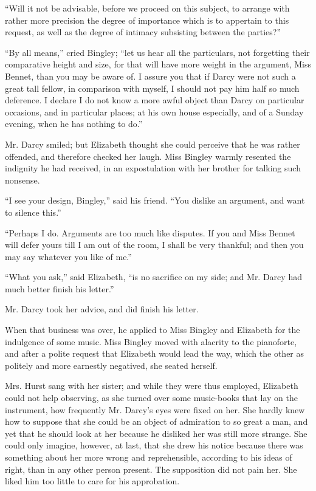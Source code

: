\documentclass[12pt,openright]{book}
\begin{document}
“Will it not be advisable, before we proceed on this subject, to arrange with rather more precision the degree of importance which is to appertain to this request, as well as the degree of intimacy subsisting between the parties?”

“By all means,” cried Bingley; “let us hear all the particulars, not forgetting their comparative height and size, for that will have more weight in the argument, Miss Bennet, than you may be aware of. I assure you that if Darcy were not such a great tall fellow, in comparison with myself, I should not pay him half so much deference. I declare I do not know a more awful object than Darcy on particular occasions, and in particular places; at his own house especially, and of a Sunday evening, when he has nothing to do.”

Mr. Darcy smiled; but Elizabeth thought she could perceive that he was rather offended, and therefore checked her laugh. Miss Bingley warmly resented the indignity he had received, in an expostulation with her brother for talking such nonsense.

“I see your design, Bingley,” said his friend. “You dislike an argument, and want to silence this.”

“Perhaps I do. Arguments are too much like disputes. If you and Miss Bennet will defer yours till I am out of the room, I shall be very thankful; and then you may say whatever you like of me.”

“What you ask,” said Elizabeth, “is no sacrifice on my side; and Mr. Darcy had much better finish his letter.”

Mr. Darcy took her advice, and did finish his letter.

When that business was over, he applied to Miss Bingley and Elizabeth for the indulgence of some music. Miss Bingley moved with alacrity to the pianoforte, and after a polite request that Elizabeth would lead the way, which the other as politely and more earnestly negatived, she seated herself.

Mrs. Hurst sang with her sister; and while they were thus employed, Elizabeth could not help observing, as she turned over some music-books that lay on the instrument, how frequently Mr. Darcy’s eyes were fixed on her. She hardly knew how to suppose that she could be an object of admiration to so great a man, and yet that he should look at her because he disliked her was still more strange. She could only imagine, however, at last, that she drew his notice because there was something about her more wrong and reprehensible, according to his ideas of right, than in any other person present. The supposition did not pain her. She liked him too little to care for his approbation.
\end{document}
